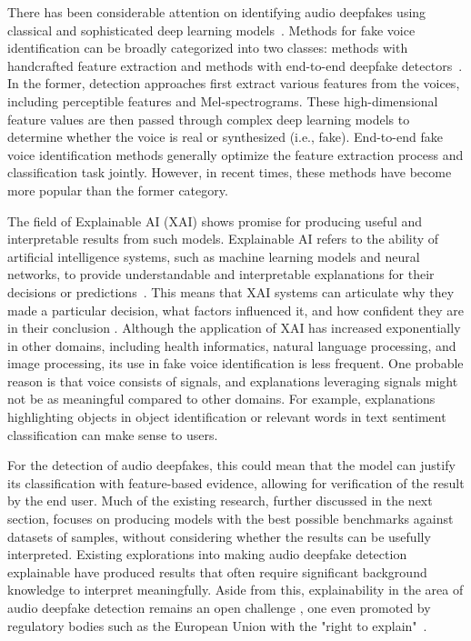 \documentclass{article}
\begin{document}
There has been considerable attention on identifying audio deepfakes using classical and sophisticated deep learning models~\cite{wang2020deepsonar,becker2024audiomnist,muller_does_2022,yang_robust_2024,wang_asvspoof_2020}. Methods for fake voice identification can be broadly categorized into two classes: methods with handcrafted feature extraction and methods with end-to-end deepfake detectors~\cite{dixit2023review,li2025survey}. In the former, detection approaches first extract various features from the voices, including perceptible features and Mel-spectrograms. These high-dimensional feature values are then passed through complex deep learning models to determine whether the voice is real or synthesized (i.e., fake). End-to-end fake voice identification methods generally optimize the feature extraction process and classification task jointly. However, in recent times, these methods have become more popular than the former category.

The field of Explainable AI (XAI) shows promise for producing useful and interpretable results from such models. Explainable AI refers to the ability of artificial intelligence systems, such as machine learning models and neural networks, to provide understandable and interpretable explanations for their decisions or predictions~\cite{hind_explaining_2019}. This means that XAI systems can articulate why they made a particular decision, what factors influenced it, and how confident they are in their conclusion \cite{hind_explaining_2019}. Although the application of XAI has increased exponentially in other domains, including health informatics, natural language processing, and image processing, its use in fake voice identification is less frequent. One probable reason is that voice consists of signals, and explanations leveraging signals might not be as meaningful compared to other domains. For example, explanations highlighting objects in object identification or relevant words in text sentiment classification can make sense to users.

For the detection of audio deepfakes, this could mean that the model can justify its classification with feature-based evidence, allowing for verification of the result by the end user. Much of the existing research, further discussed in the next section, focuses on producing models with the best possible benchmarks against datasets of samples, without considering whether the results can be usefully interpreted. Existing explorations into making audio deepfake detection explainable have produced results that often require significant background knowledge to interpret meaningfully. Aside from this, explainability in the area of audio deepfake detection remains an open challenge \cite{cuccovillo_open_2022}, one even promoted by regulatory bodies such as the European Union with the "right to explain"~\cite{goodman_european_2017}.
\end{document}
